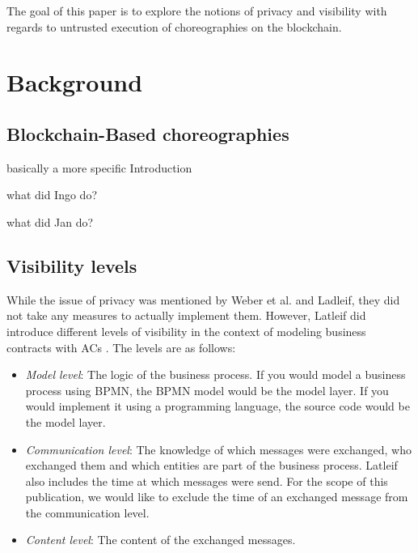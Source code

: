 \documentclass[runningheads]{llncs}
\newcommand{\ber}[1]{\textit{#1}}
\begin{document}
The goal  of this paper is to explore the notions of privacy and visibility with regards to untrusted execution of choreographies on the blockchain. 



\section{Background} \label{sec:backgrounmotivation}

\subsection{Blockchain-Based choreographies} \label{subsec:blockchainbased}

basically a more specific Introduction

what did Ingo do?

what did Jan do?




\subsection{Visibility levels} \label{subsec:levels}

While the issue of privacy was mentioned by Weber et al. and Ladleif, they did not take any measures to actually implement them. However, Latleif did introduce different levels of visibility in the context of modeling business contracts with ACs \cite{ladleif}. The levels are as follows:



\begin{itemize}
    \item \ber{Model level}: The logic of the business process. If you would model a business process using BPMN, the BPMN model would be the model layer. If you would implement it using a programming language, the source code would be the model layer.
    \item \ber{Communication level}: The knowledge of which messages were exchanged, who exchanged them and which entities are part of the business process. Latleif also includes the time at which messages were send. For the scope of this publication, we would like to exclude the time of an exchanged message from the communication level.
    \item \ber{Content level}: The content of the exchanged messages.
\end{itemize}
\end{document}
